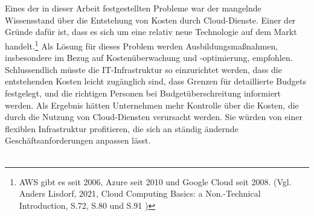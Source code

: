 \\\\
Eines der in dieser Arbeit festgestellten Probleme war der mangelnde Wissensstand über die Entstehung von Kosten durch Cloud-Dienste. Einer der Gründe dafür ist, dass es sich um eine relativ neue Technologie auf dem Markt handelt.\footnote{AWS gibt es seit 2006, Azure seit 2010 und Google Cloud seit 2008. (Vgl. Anders Lisdorf, 2021, Cloud Computing Basics: a Non.-Technical Introduction, S.72, S.80 und S.91 \cite{CCB})}
Als Lösung für dieses Problem werden Ausbildungsmaßnahmen, insbesondere im Bezug auf Kostenüberwachung und -optimierung, empfohlen. Schlussendlich müsste die IT-Infrastruktur so einzurichtet werden, dass die entstehenden Kosten leicht zugänglich sind, dass Grenzen für detaillierte Budgets festgelegt, und die richtigen Personen bei Budgetüberschreitung informiert werden. Als Ergebnis hätten Unternehmen mehr Kontrolle über die Kosten, die durch die Nutzung von Cloud-Diensten verursacht werden. Sie würden von einer flexiblen Infrastruktur profitieren, die sich an ständig ändernde Geschäftsanforderungen anpassen lässt. 
\\\\
